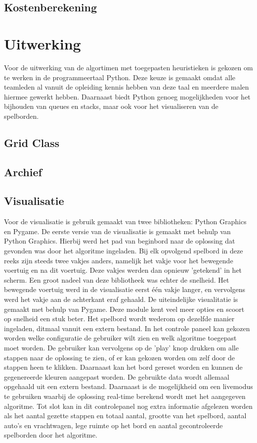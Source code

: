 \documentclass[a4paper]{article}
\begin{document}
\subsection{Kostenberekening}




\section{Uitwerking}
Voor de uitwerking van de algortimen met toegepasten heuristieken is gekozen om te werken in de programmeertaal Python. Deze keuze is gemaakt omdat alle teamleden al vanuit de opleiding kennis hebben van deze taal en meerdere malen hiermee gewerkt hebben. Daarnaast biedt Python genoeg mogelijkheden voor het bijhouden van queues en stacks, maar ook voor het visualiseren van de spelborden.

\subsection{Grid Class}


\subsection{Archief}


\subsection{Visualisatie}
Voor de visualisatie is gebruik gemaakt van twee bibliotheken: Python Graphics en Pygame. De eerste versie van de visualisatie is gemaakt met behulp van Python Graphics. Hierbij werd het pad van beginbord naar de oplossing dat gevonden was door het algoritme ingeladen. Bij elk opvolgend spelbord in deze reeks zijn steeds twee vakjes anders, namelijk het vakje voor het bewegende voertuig en na dit voertuig. Deze vakjes werden dan opnieuw 'getekend' in het scherm. Een groot nadeel van deze bibliotheek was echter de snelheid. Het bewegende voertuig werd in de visualisatie eerst één vakje langer, en vervolgens werd het vakje aan de achterkant eraf gehaald. 
	De uiteindelijke visualitatie is gemaakt met behulp van Pygame. Deze module kent veel meer opties en scoort op snelheid een stuk beter. Het spelbord wordt wederom op dezelfde manier ingeladen, ditmaal vanuit een extern bestand. In het controle paneel kan gekozen worden welke configuratie de gebruiker wilt zien en welk algoritme toegepast moet worden. De gebruiker kan vervolgens op de 'play' knop drukken om alle stappen naar de oplossing te zien, of er kan gekozen worden om zelf door de stappen heen te klikken. Daarnaast kan het bord gereset worden en kunnen de gegenereerde kleuren aangepast worden. De gebruikte data wordt allemaal opgehaald uit een extern bestand. Daarnaast is de mogelijkheid om een livemodus te gebruiken waarbij de oplossing real-time berekend wordt met het aangegeven algoritme. Tot slot kan in dit controlepanel nog extra informatie afgelezen worden als het aantal gezette stappen en totaal aantal, grootte van het spelbord, aantal auto's en vrachtwagen, lege ruimte op het bord en aantal gecontroleerde spelborden door het algoritme.
    
\end{document}

